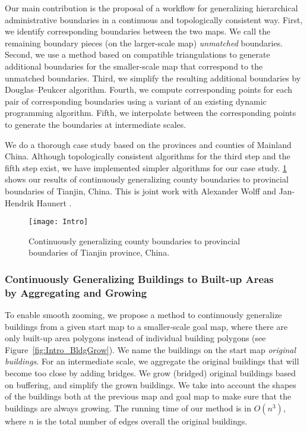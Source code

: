 Our main contribution is the proposal of a workflow for
generalizing hierarchical administrative boundaries in a
continuous and topologically consistent way.  First, we
identify corresponding boundaries between the two maps.
We call the remaining boundary pieces (on the larger-scale map)
\emph{unmatched} boundaries.  Second, we use a method based on 
compatible triangulations to generate
additional boundaries for the smaller-scale map that correspond 
to the
unmatched boundaries.  
Third, we simplify the resulting additional boundaries
by Douglas--Peukcer algorithm.  
Fourth, we compute corresponding points for each pair
of corresponding boundaries using a variant of an existing 
dynamic programming algorithm.  
Fifth, we interpolate between the corresponding points
to generate the boundaries at intermediate scales.

We do a thorough
case study based on the provinces and counties of Mainland China.
Although topologically consistent algorithms for the third step 
and the
fifth step exist, we have implemented simpler algorithms for our
case study. 
\fig\ref{fig:Intro_AdminBound_Tianjin} shows our results of 
continuously generalizing county boundaries 
to provincial boundaries of Tianjin, China.
This is joint work with Alexander Wolff and Jan-Hendrik Haunert
\cite{Peng2016Admin}.

\begin{figure}[tb]
	\centering
	\texttt{[image: Intro]}
	\caption{Continuously generalizing county boundaries to 
	provincial boundaries of Tianjin province, China.}
	\label{fig:Intro_AdminBound_Tianjin}
\end{figure}

\subsubsection{Continuously Generalizing Buildings to Built-up Areas\\ 
	by Aggregating and Growing}

To enable smooth zooming, we propose a method to continuously 
generalize buildings from a given start map to a smaller-scale 
goal map, where 
there are only built-up area polygons instead of individual 
building polygons
(see Figure~\ref{fig:Intro_BldgGrow}).
We name the buildings on the start map \emph{original buildings}.
%
For an intermediate scale, 
we aggregate the original buildings that will become too close 
by adding bridges.
We grow (bridged) original buildings based on buffering, 
and simplify the grown buildings.
We take into account the shapes of the buildings 
both at the previous map and goal map to make sure that 
the buildings are always growing.
The running time of our method is in $O(n^3)$,
where $n$ is the total number of edges
overall the original buildings.
%

